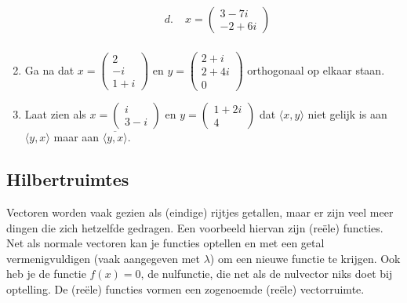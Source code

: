\documentclass[../../main.tex]{subfiles}
\begin{document}
\begin{opdrachtlang}
\begin{enumerate}
\begin{align*}
        & d.\;& x=\begin{pmatrix}3-7i\\-2+6i\end{pmatrix}\\
    \end{align*}
    \item Ga na dat $x=\begin{pmatrix}2\\-i\\1+i\end{pmatrix}$ en $y=\begin{pmatrix}2+i\\2+4i\\0\end{pmatrix}$ orthogonaal op elkaar staan.
    \item Laat zien als $x=\begin{pmatrix}i\\3-i\end{pmatrix}$ en $y=\begin{pmatrix}1+2i\\4\end{pmatrix}$ dat $\langle x,y\rangle$ niet gelijk is aan $\langle y, x\rangle$ maar aan  $\overline{\langle y,x\rangle}$.
\end{enumerate}
\end{opdrachtlang}

\subsection*{Hilbertruimtes}
Vectoren worden vaak gezien als (eindige) rijtjes getallen, maar er zijn veel meer dingen die zich hetzelfde gedragen. 
Een voorbeeld hiervan zijn (reële) functies.
Net als normale vectoren kan je functies optellen en met een getal vermenigvuldigen (vaak aangegeven met $\lambda$) om een nieuwe functie te krijgen.
Ook heb je de functie $f(x)=0$, de nulfunctie, die net als de nulvector niks doet bij optelling. De (reële) functies vormen een zogenoemde (reële) vectorruimte.
\end{document}
